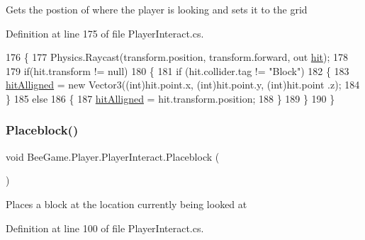 Gets the postion of where the player is looking and sets it to the grid 



Definition at line 175 of file Player\+Interact.\+cs.


\begin{DoxyCode}
176         \{
177             Physics.Raycast(transform.position, transform.forward, out \hyperlink{class_bee_game_1_1_player_1_1_player_interact_a39537118b4601a3596122f124b684024}{hit});
178 
179             \textcolor{keywordflow}{if}(hit.transform != null)
180             \{
181                 \textcolor{keywordflow}{if} (hit.collider.tag != \textcolor{stringliteral}{"Block"})
182                 \{
183                     \hyperlink{class_bee_game_1_1_player_1_1_player_interact_ad7b39d8900f206f680945437ff3259a8}{hitAlligned} = \textcolor{keyword}{new} Vector3((\textcolor{keywordtype}{int})hit.point.x, (\textcolor{keywordtype}{int})hit.point.y, (\textcolor{keywordtype}{int})hit.point
      .z);
184                 \}
185                 \textcolor{keywordflow}{else}
186                 \{
187                     \hyperlink{class_bee_game_1_1_player_1_1_player_interact_ad7b39d8900f206f680945437ff3259a8}{hitAlligned} = hit.transform.position;
188                 \}
189             \}
190         \}
\end{DoxyCode}
\mbox{\label{class_bee_game_1_1_player_1_1_player_interact_a55ce2fd36c1120aed30893502f1e909f}} 
\subsubsection{\texorpdfstring{Placeblock()}{Placeblock()}}
{\footnotesize\ttfamily void Bee\+Game.\+Player.\+Player\+Interact.\+Placeblock (\begin{DoxyParamCaption}{ }\end{DoxyParamCaption})\hspace{0.3cm}{\ttfamily [private]}}



Places a block at the location currently being looked at 



Definition at line 100 of file Player\+Interact.\+cs.


